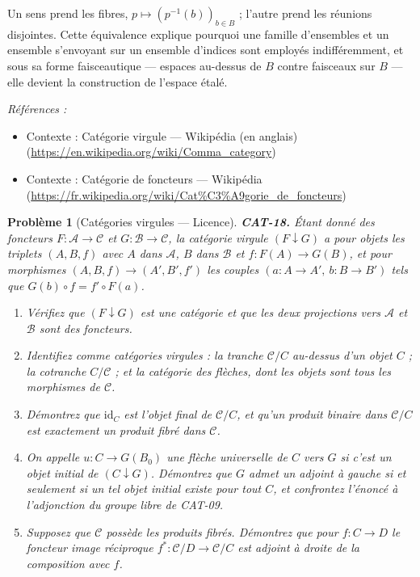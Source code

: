 \documentclass[11pt]{article}
\newtheorem{problem}{Problème}
\newenvironment{refs}{\par\small\noindent\emph{Références :}\begin{itemize}\setlength\itemsep{0pt}}{\end{itemize}\normalsize}
\begin{document}
\noindent Un sens prend les fibres, $ p \mapsto (p^{-1}(b))_{b \in B} $ ; l'autre prend
les réunions disjointes. Cette équivalence explique pourquoi \og{} une famille d'ensembles \fg{} et \og{} un
ensemble s'envoyant sur un ensemble d'indices \fg{} sont employés indifféremment, et sous sa forme
faisceautique --- espaces au-dessus de $ B $ contre faisceaux sur $ B $ --- elle devient la
construction de l'espace étalé.

\begin{refs}
\item Contexte : Catégorie virgule --- Wikipédia (en anglais) (\url{https://en.wikipedia.org/wiki/Comma_category})
\item Contexte : Catégorie de foncteurs --- Wikipédia (\url{https://fr.wikipedia.org/wiki/Cat%C3%A9gorie_de_foncteurs})
\end{refs}

\bigskip

\begin{problem}[{Catégories virgules --- Licence}]
\textbf{CAT-18.} Étant donné des foncteurs $ F\colon \mathcal{A} \to \mathcal{C} $ et
$ G\colon \mathcal{B} \to \mathcal{C} $, la \textit{catégorie virgule}
$ (F \downarrow G) $ a pour objets les triplets $ (A, B, f) $ avec $ A $ dans
$ \mathcal{A} $, $ B $ dans $ \mathcal{B} $ et $ f\colon F(A) \to G(B) $, et pour
morphismes $ (A, B, f) \to (A', B', f') $ les couples $ (a\colon A \to A',\ b\colon B \to B') $
tels que $ G(b) \circ f = f' \circ F(a) $.
\begin{enumerate}
\item[(a)] Vérifiez que $ (F \downarrow G) $ est une catégorie et que les deux projections vers
$ \mathcal{A} $ et $ \mathcal{B} $ sont des foncteurs.
\item[(b)] Identifiez comme catégories virgules : la tranche $ \mathcal{C}/C $ au-dessus d'un objet
$ C $ ; la cotranche $ C/\mathcal{C} $ ; et la catégorie des flèches, dont les objets sont
tous les morphismes de $ \mathcal{C} $.
\item[(c)] Démontrez que $ \mathrm{id}_C $ est l'objet final de $ \mathcal{C}/C $, et qu'un produit
binaire dans $ \mathcal{C}/C $ est exactement un produit fibré dans $ \mathcal{C} $.
\item[(d)] On appelle $ u\colon C \to G(B_0) $ une \textit{flèche universelle} de $ C $ vers $ G $ si
c'est un objet initial de $ (C \downarrow G) $. Démontrez que $ G $ admet un adjoint à gauche
si et seulement si un tel objet initial existe pour tout $ C $, et confrontez l'énoncé à
l'adjonction du groupe libre de CAT-09.
\item[(e)] Supposez que $ \mathcal{C} $ possède les produits fibrés. Démontrez que pour
$ f\colon C \to D $ le foncteur image réciproque
$ f^{*}\colon \mathcal{C}/D \to \mathcal{C}/C $ est adjoint à droite de la composition avec
$ f $.
\end{enumerate}

\end{problem}
\end{document}
